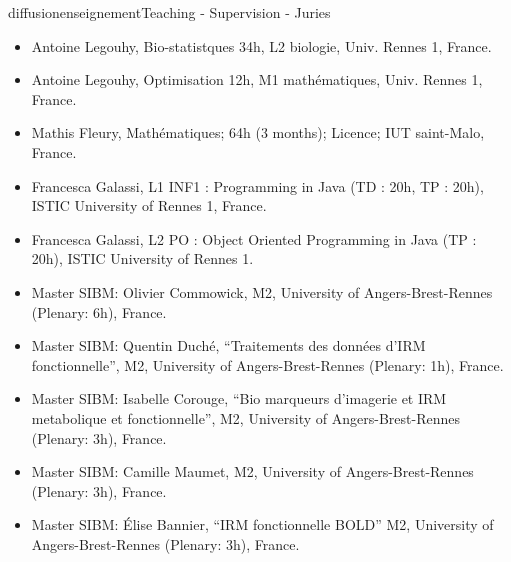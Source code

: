 \documentclass{ra2018}
\begin{document}
\begin{module}{diffusion}{enseignement}{Teaching - Supervision - Juries}
\begin{itemize}
    \item Antoine Legouhy, Bio-statistques 34h, L2 biologie, Univ. Rennes 1, France.
    \item Antoine Legouhy, Optimisation 12h, M1 mathématiques, Univ. Rennes 1, France.
    \item Mathis Fleury, Mathématiques; 64h (3 months); Licence; IUT saint-Malo, France.
    \item Francesca Galassi, L1 INF1 : Programming in Java (TD : 20h, TP : 20h), ISTIC University of Rennes 1, France.
    \item Francesca Galassi, L2 PO : Object Oriented Programming in Java (TP : 20h), ISTIC University of Rennes 1.
    \item Master SIBM: Olivier Commowick, M2, University of Angers-Brest-Rennes (Plenary: 6h), France.
    \item Master SIBM: Quentin Duché, ``Traitements des données d'IRM fonctionnelle'', M2, University of Angers-Brest-Rennes (Plenary: 1h), France.
    \item Master SIBM: Isabelle Corouge, ``Bio marqueurs d’imagerie et IRM metabolique et fonctionnelle'', M2, University of Angers-Brest-Rennes (Plenary: 3h), France.
    \item Master SIBM: Camille Maumet, M2, University of Angers-Brest-Rennes (Plenary: 3h), France.
    \item Master SIBM: Élise Bannier, ``IRM fonctionnelle BOLD'' M2, University of Angers-Brest-Rennes (Plenary: 3h), France.
 \end{itemize}




\end{module}
\end{document}
